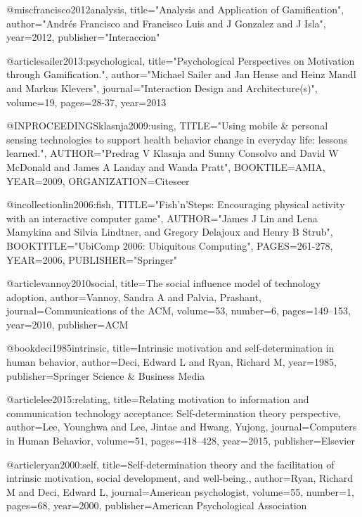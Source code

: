 @misc{francisco2012analysis,
  title="Analysis and Application of Gamification",
  author="Andr{\'e}s Francisco and Francisco Luis and J Gonzalez and J Isla",
  year={2012},
  publisher="Interaccion"
}

@article{sailer2013:psychological,
  title="Psychological Perspectives on Motivation through Gamification.",
  author="Michael Sailer and Jan Hense and Heinz Mandl and Markus Klevers",
  journal="Interaction Design and Architecture(s)",
  volume={19},
  pages={28-37},
  year={2013}
}

@INPROCEEDINGS{klasnja2009:using,
  TITLE="Using mobile \& personal sensing technologies to support health behavior change in everyday life: lessons learned.",
  AUTHOR="Predrag V Klasnja and Sunny Consolvo and David W McDonald and James A Landay and Wanda Pratt",
  BOOKTILE={AMIA},
  YEAR={2009},
  ORGANIZATION={Citeseer}
}

@incollection{lin2006:fish,
  TITLE="Fish'n'Steps: Encouraging physical activity with an interactive computer game",
  AUTHOR="James J Lin and Lena Mamykina and Silvia Lindtner,  and Gregory Delajoux and Henry B Strub",
  BOOKTITLE="UbiComp 2006: Ubiquitous Computing",
  PAGES={261-278},
  YEAR={2006},
  PUBLISHER="Springer"
}

@article{vannoy2010social,
  title={The social influence model of technology adoption},
  author={Vannoy, Sandra A and Palvia, Prashant},
  journal={Communications of the ACM},
  volume={53},
  number={6},
  pages={149--153},
  year={2010},
  publisher={ACM}
}

@book{deci1985intrinsic,
  title={Intrinsic motivation and self-determination in human behavior},
  author={Deci, Edward L and Ryan, Richard M},
  year={1985},
  publisher={Springer Science \& Business Media}
}

@article{lee2015:relating,
  title={Relating motivation to information and communication technology acceptance: Self-determination theory perspective},
  author={Lee, Younghwa and Lee, Jintae and Hwang, Yujong},
  journal={Computers in Human Behavior},
  volume={51},
  pages={418--428},
  year={2015},
  publisher={Elsevier}
}

@article{ryan2000:self,
  title={Self-determination theory and the facilitation of intrinsic motivation, social development, and well-being.},
  author={Ryan, Richard M and Deci, Edward L},
  journal={American psychologist},
  volume={55},
  number={1},
  pages={68},
  year={2000},
  publisher={American Psychological Association}
}

